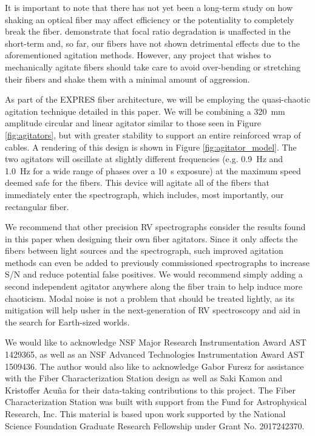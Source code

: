 \documentclass[twocolumn]{emulateapj}
\begin{document}
It is important to note that there has not yet been a long-term study on how shaking an optical fiber may affect efficiency or the potentiality to completely break the fiber. \citet{Sablowski2015} demonstrate that focal ratio degradation is unaffected in the short-term and, so far, our fibers have not shown detrimental effects due to the aforementioned agitation methods. However, any project that wishes to mechanically agitate fibers should take care to avoid over-bending or stretching their fibers and shake them with a minimal amount of aggression.

As part of the EXPRES fiber architecture, we will be employing the quasi-chaotic agitation technique detailed in this paper. We will be combining a \SI{320}{\milli\meter} amplitude circular and linear agitator similar to those seen in Figure \ref{fig:agitators}, but with greater stability to support an entire reinforced wrap of cables. A rendering of this design is shown in Figure \ref{fig:agitator_model}. The two agitators will oscillate at slightly different frequencies (e.g. \SI{0.9}{\hertz} and \SI{1.0}{\hertz} for a wide range of phases over a \SI{10}{\second} exposure) at the maximum speed deemed safe for the fibers. This device will agitate all of the fibers that immediately enter the spectrograph, which includes, most importantly, our rectangular fiber.

We recommend that other precision RV spectrographs consider the results found in this paper when designing their own fiber agitators. Since it only affects the fibers between light sources and the spectrograph, such improved agitation methods can even be added to previously commissioned spectrographs to increase S/N and reduce potential false positives. We would recommend simply adding a second independent agitator anywhere along the fiber train to help induce more chaoticism. Modal noise is not a problem that should be treated lightly, as its mitigation will help usher in the next-generation of RV spectroscopy and aid in the search for Earth-sized worlds.

\acknowledgments

We would like to acknowledge NSF Major Research Instrumentation Award AST 1429365, as well as an NSF Advanced Technologies Instrumentation Award AST 1509436. The author would also like to acknowledge Gabor Furesz for assistance with the Fiber Characterization Station design as well as Saki Kamon and Kristoffer Acu\~na for their data-taking contributions to this project. The Fiber Characterization Station was built with support from the Fund for Astrophysical Research, Inc. This material is based upon work supported by the National Science Foundation Graduate Research Fellowship under Grant No. 2017242370.

\end{document}
